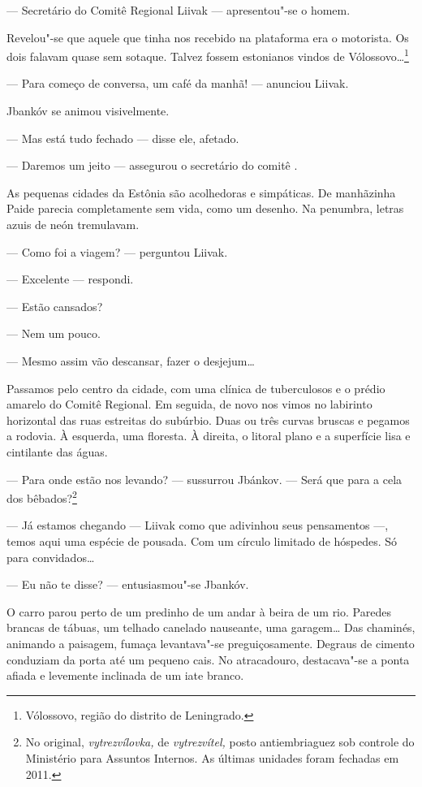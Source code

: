 --- Secretário do Comitê Regional Liivak --- apresentou"-se
o homem.

Revelou"-se que aquele que tinha nos recebido na plataforma era o
motorista. Os dois falavam quase sem sotaque. Talvez fossem estonianos
vindos de Vólossovo\ldots{}\footnote{Vólossovo, região do distrito de
  Leningrado.}

--- Para começo de conversa, um café da manhã! ---
anunciou Liivak.

Jbankóv se animou visivelmente.

--- Mas está tudo fechado --- disse ele, afetado.

--- Daremos um jeito --- assegurou o secretário do comitê
.

As pequenas cidades da Estônia são acolhedoras e simpáticas. De
manhãzinha Paide parecia completamente sem vida, como um desenho. Na
penumbra, letras azuis de neón tremulavam.

--- Como foi a viagem? --- perguntou Liivak.

--- Excelente --- respondi.

--- Estão cansados?

--- Nem um pouco.

--- Mesmo assim vão descansar, fazer o desjejum\ldots{}

Passamos pelo centro da cidade, com uma clínica de tuberculosos e o
prédio amarelo do Comitê Regional. Em seguida, de novo nos vimos no
labirinto horizontal das ruas estreitas do subúrbio. Duas ou três curvas
bruscas e pegamos a rodovia. À esquerda, uma floresta. À direita, o
litoral plano e a superfície lisa e cintilante das águas.

--- Para onde estão nos levando? --- sussurrou Jbánkov.
--- Será que para a cela dos bêbados?\footnote{No original,
  \emph{vytrezvílovka,} de \emph{vytrezvítel,} posto antiembriaguez sob
  controle do Ministério para Assuntos Internos. As últimas unidades
  foram fechadas em 2011.}

--- Já estamos chegando --- Liivak como que adivinhou seus
pensamentos ---, temos aqui uma espécie de pousada. Com um
círculo limitado de hóspedes. Só para convidados\ldots{}

--- Eu não te disse? --- entusiasmou"-se Jbankóv.

O carro parou perto de um predinho de um andar à beira de um rio.
Paredes brancas de tábuas, um telhado canelado nauseante, uma garagem\ldots{}
Das chaminés, animando a paisagem, fumaça levantava"-se preguiçosamente.
Degraus de cimento conduziam da porta até um pequeno cais. No
atracadouro, destacava"-se a ponta afiada e levemente inclinada de um
iate branco.

